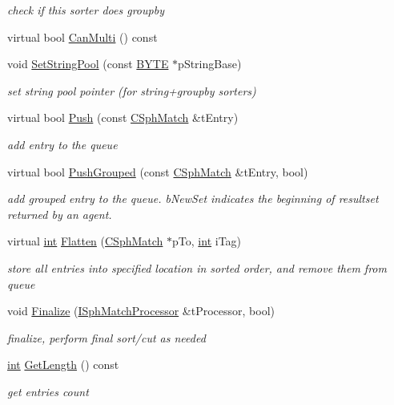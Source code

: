 \begin{DoxyCompactItemize}
\begin{DoxyCompactList}\small\item\em check if this sorter does groupby \end{DoxyCompactList}\item 
virtual bool \hyperlink{classCSphImplicitGroupSorter_ab0db83793cb05a1da3968026c646ae05}{Can\-Multi} () const 
\item 
void \hyperlink{classCSphImplicitGroupSorter_a95669fbfbe8fdc1090d00510c9fa15c9}{Set\-String\-Pool} (const \hyperlink{sphinxstd_8h_a4ae1dab0fb4b072a66584546209e7d58}{B\-Y\-T\-E} $\ast$p\-String\-Base)
\begin{DoxyCompactList}\small\item\em set string pool pointer (for string+groupby sorters) \end{DoxyCompactList}\item 
virtual bool \hyperlink{classCSphImplicitGroupSorter_aca294d2d2d52efbefe8bc4d3c9a53e20}{Push} (const \hyperlink{classCSphMatch}{C\-Sph\-Match} \&t\-Entry)
\begin{DoxyCompactList}\small\item\em add entry to the queue \end{DoxyCompactList}\item 
virtual bool \hyperlink{classCSphImplicitGroupSorter_a919aba3d5bc9cddc43686933e80f2636}{Push\-Grouped} (const \hyperlink{classCSphMatch}{C\-Sph\-Match} \&t\-Entry, bool)
\begin{DoxyCompactList}\small\item\em add grouped entry to the queue. b\-New\-Set indicates the beginning of resultset returned by an agent. \end{DoxyCompactList}\item 
virtual \hyperlink{sphinxexpr_8cpp_a4a26e8f9cb8b736e0c4cbf4d16de985e}{int} \hyperlink{classCSphImplicitGroupSorter_a9aa145528cefba610499c2e6cbf89533}{Flatten} (\hyperlink{classCSphMatch}{C\-Sph\-Match} $\ast$p\-To, \hyperlink{sphinxexpr_8cpp_a4a26e8f9cb8b736e0c4cbf4d16de985e}{int} i\-Tag)
\begin{DoxyCompactList}\small\item\em store all entries into specified location in sorted order, and remove them from queue \end{DoxyCompactList}\item 
void \hyperlink{classCSphImplicitGroupSorter_a2d3c9a2bc785df8239a040ab7825840a}{Finalize} (\hyperlink{structISphMatchProcessor}{I\-Sph\-Match\-Processor} \&t\-Processor, bool)
\begin{DoxyCompactList}\small\item\em finalize, perform final sort/cut as needed \end{DoxyCompactList}\item 
\hyperlink{sphinxexpr_8cpp_a4a26e8f9cb8b736e0c4cbf4d16de985e}{int} \hyperlink{classCSphImplicitGroupSorter_a68e334fde7c495fed2cd9b436e50d4ae}{Get\-Length} () const 
\begin{DoxyCompactList}\small\item\em get entries count \end{DoxyCompactList}\end{DoxyCompactItemize}
